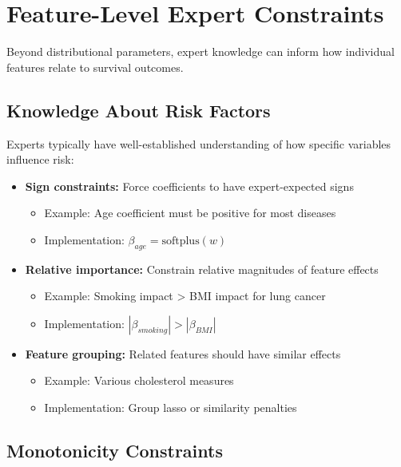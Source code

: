 \section{Feature-Level Expert Constraints}

Beyond distributional parameters, expert knowledge can inform how individual features relate to survival outcomes.

\subsection{Knowledge About Risk Factors}

Experts typically have well-established understanding of how specific variables influence risk:

\begin{itemize}
    \item \textbf{Sign constraints:} Force coefficients to have expert-expected signs
    \begin{itemize}
        \item Example: Age coefficient must be positive for most diseases
        \item Implementation: $\beta_{age} = \text{softplus}(w)$
    \end{itemize}

    \item \textbf{Relative importance:} Constrain relative magnitudes of feature effects
    \begin{itemize}
        \item Example: Smoking impact > BMI impact for lung cancer
        \item Implementation: $|\beta_{smoking}| > |\beta_{BMI}|$
    \end{itemize}

    \item \textbf{Feature grouping:} Related features should have similar effects
    \begin{itemize}
        \item Example: Various cholesterol measures
        \item Implementation: Group lasso or similarity penalties
    \end{itemize}
\end{itemize}

\subsection{Monotonicity Constraints}

